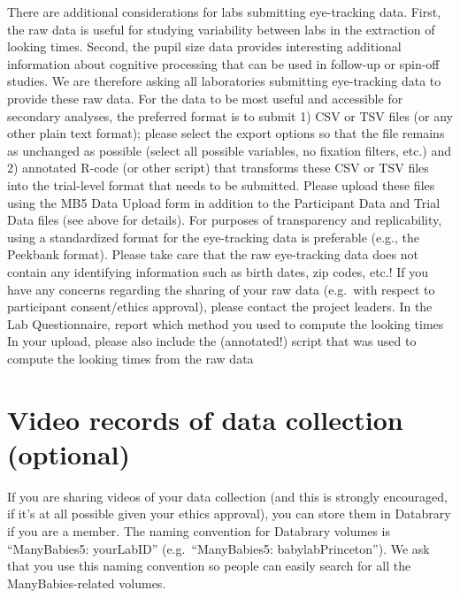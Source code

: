 \documentclass[
  letterpaper,
  DIV=11,
  numbers=noendperiod,
  oneside]{scrreprt}
\begin{document}
There are additional considerations for labs submitting eye-tracking
data. First, the raw data is useful for studying variability between
labs in the extraction of looking times. Second, the pupil size data
provides interesting additional information about cognitive processing
that can be used in follow-up or spin-off studies. We are therefore
asking all laboratories submitting eye-tracking data to provide these
raw data. For the data to be most useful and accessible for secondary
analyses, the preferred format is to submit 1) CSV or TSV files (or any
other plain text format); please select the export options so that the
file remains as unchanged as possible (select all possible variables, no
fixation filters, etc.) and 2) annotated R-code (or other script) that
transforms these CSV or TSV files into the trial-level format that needs
to be submitted. Please upload these files using the MB5 Data Upload
form in addition to the Participant Data and Trial Data files (see above
for details). For purposes of transparency and replicability, using a
standardized format for the eye-tracking data is preferable (e.g., the
Peekbank format). Please take care that the raw eye-tracking data does
not contain any identifying information such as birth dates, zip codes,
etc.! If you have any concerns regarding the sharing of your raw data
(e.g.~with respect to participant consent/ethics approval), please
contact the project leaders. In the Lab Questionnaire, report which
method you used to compute the looking times In your upload, please also
include the (annotated!) script that was used to compute the looking
times from the raw data

\section*{Video records of data collection
(optional)}\label{video-records-of-data-collection-optional}


If you are sharing videos of your data collection (and this is strongly
encouraged, if it's at all possible given your ethics approval), you can
store them in Databrary if you are a member. The naming convention for
Databrary volumes is ``ManyBabies5: yourLabID'' (e.g.~``ManyBabies5:
babylabPrinceton''). We ask that you use this naming convention so
people can easily search for all the ManyBabies-related volumes.
\end{document}
